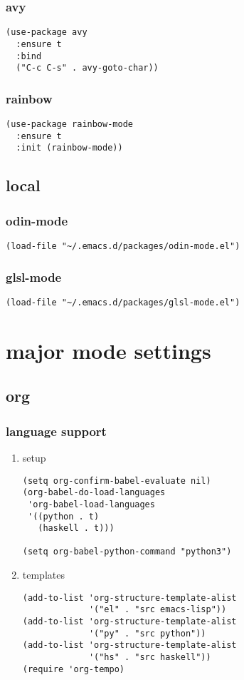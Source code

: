 \documentclass[11pt]{article}
\begin{document}
\subsubsection{avy}
\label{sec:orgd50278a}
\begin{verbatim}
(use-package avy
  :ensure t
  :bind
  ("C-c C-s" . avy-goto-char))
\end{verbatim}
\subsubsection{rainbow}
\label{sec:orgcadf6c9}
\begin{verbatim}
(use-package rainbow-mode
  :ensure t
  :init (rainbow-mode))
\end{verbatim}
\subsection{local}
\label{sec:orga444f4c}
\subsubsection{odin-mode}
\label{sec:org0bda5c2}
\begin{verbatim}
(load-file "~/.emacs.d/packages/odin-mode.el")
\end{verbatim}
\subsubsection{glsl-mode}
\label{sec:org0614e5d}
\begin{verbatim}
(load-file "~/.emacs.d/packages/glsl-mode.el")
\end{verbatim}
\section{major mode settings}
\label{sec:orgd308ff7}
\subsection{org}
\label{sec:org8751b1d}
\subsubsection{language support}
\label{sec:org505e7fe}
\begin{enumerate}
\item setup
\label{sec:org7c62260}
\begin{verbatim}
(setq org-confirm-babel-evaluate nil)
(org-babel-do-load-languages
 'org-babel-load-languages
 '((python . t)
   (haskell . t)))

(setq org-babel-python-command "python3")
\end{verbatim}
\item templates
\label{sec:orgf21cb99}
\begin{verbatim}
(add-to-list 'org-structure-template-alist
             '("el" . "src emacs-lisp"))
(add-to-list 'org-structure-template-alist
             '("py" . "src python"))
(add-to-list 'org-structure-template-alist
             '("hs" . "src haskell"))
(require 'org-tempo)
\end{verbatim}
\end{enumerate}
\end{document}
